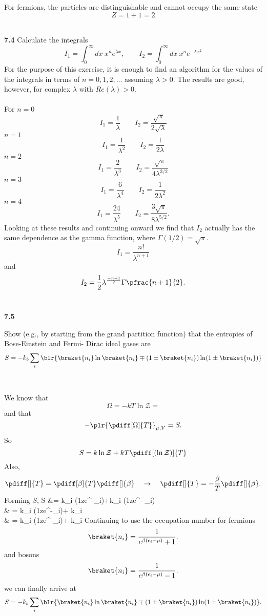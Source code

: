 \documentclass[11pt,letterpaper]{article}
\begin{document}
	\item
	For fermions, the particles are distinguishable and cannot occupy the same state
	\[
		Z = 1+1 = 2
	\]
	\\
	\eenum
	\item[\textbf{7.4}]
	Calculate the integrals
	\[
		I_1 = \int_0^\infty dx\ x^n e^{\lambda x},\qquad I_2= \int_0^\infty dx\ x^ne^{-\lambda x^2}
	\]
	For the purpose of this exercise, it is enough to find an algorithm for the values of the integrals in terms of 
	$n = 0,1,2,...$ assuming $\lambda >0$. The results are good, however, for complex $\lambda$ with 
	$Re(\lambda)>0$. 
	\\
	\\
	For $n=0$ 
	\[
		I_1 = \frac{1}{\lambda}\qquad I_2 = \frac{\sqrt \pi}{2\sqrt \lambda}
	\]
	$n=1$
	\[
		I_1 = \frac{1}{\lambda^2}\qquad I_2 = \frac{1}{2 \lambda}
	\]
	$n=2$
	\[
		I_1 = \frac{2}{\lambda^3}\qquad I_2= \frac{\sqrt \pi}{4\lambda^{3/2}}
	\]	
	$n=3$
	\[
		I_1 = \frac{6}{\lambda^4}\qquad  I_2= \frac{1}{2\lambda^2}
	\]
	$n=4$
	\[
		I_1 = \frac{24}{\lambda^5}\qquad  I_2= \frac{3\sqrt\pi}{8\lambda^{5/2}}.
	\]
	Looking at these results and continuing onward we find that $I_2$ actually has the same dependence 
	as the gamma function, where $\Gamma(1/2) =\sqrt\pi$. 
	\[
		I_1 = \frac{n!}{\lambda^{n+1}}
	\]
	and
	\[
		I_2= \frac{1}{2}\lambda^{\frac{-n+1}{2}}\Gamma\pfrac{n+1}{2}.
	\]
	\\
	\item[\textbf{7.5}]
	
	Show (e.g., by starting from the grand partition function) that the entropies of Bose-Einstein and Fermi-	Dirac
	ideal gases are
	\[
		S = -k_b\sum_i\blr{\braket{n_i}\ln\braket{n_i}\mp(1\pm\braket{n_i})\ln(1\pm\braket{n_i})}
	\]
	\\
	\\
	We know that
	\[
		\Omega = -kT\ln\mathcal Z = 
	\]
	and that
	\[
		-\plr{\pdiff[\Omega]{T}}_{\mu,V} = S.
	\]
	So
	\[
		S = k\ln \mathcal Z +kT\pdiff[(\ln\mathcal Z)]{T}
	\]
	Also,
	\[
		\pdiff[]{T} = \pdiff[\beta]{T}\pdiff[]{\beta}\quad\to\quad \pdiff[]{T} = -\frac{\beta}{T}\pdiff[]{\beta}.
	\]
	Forming $S$, 
	\ba
	S &= k\sum_i \mp\ln(1\pm ze^{-\beta\epsilon_i})+k\beta \pdiff[]{\beta}\sum_i \pm\ln(1\pm ze^{-\beta
	\epsilon_i})\\
	& = k\sum_i \mp\ln(1\pm ze^{-\beta\epsilon_i})+
	k\beta\sum_i \\
	& = k\sum_i \mp\ln(1\pm ze^{-\beta\epsilon_i})+
	k\sum_i 
	\ea
	Continuing to use the occupation number for fermions
	\[
		\braket{n_i} = \frac{1}{e^{\beta(\epsilon_i-\mu)}+1}.
	\]
	and bosons
	\[
		\braket{n_i} = \frac{1}{e^{\beta(\epsilon_i-\mu)}-1}.
	\]
	we can finally arrive at
	\[
		S = -k_b\sum_i\blr{\braket{n_i}\ln\braket{n_i}\mp(1\pm\braket{n_i})\ln(1\pm\braket{n_i})}.
	\]
	
\eenum
\end{document}
